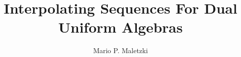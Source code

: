 \documentclass[preprint,12pt,number]{elsarticle}
\begin{document}
\begin{frontmatter}



\title{Interpolating Sequences For Dual Uniform Algebras} %


\author{Mario P. Maletzki} %



\end{frontmatter}
\end{document}
